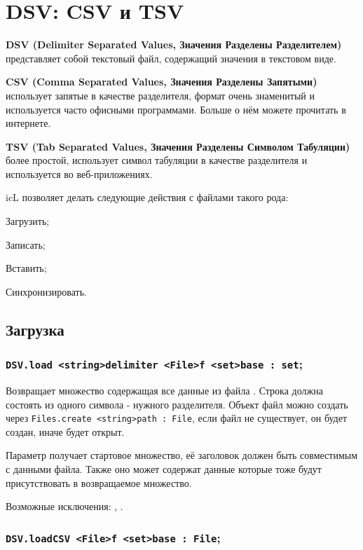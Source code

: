 \section{DSV: CSV и TSV}

{\bf DSV (Delimiter Separated Values, Значения Разделены Разделителем)} представляет собой текстовый файл, содержащий значения в текстовом виде.

{\bf CSV (Comma Separated Values, Значения Разделены Запятыми)} использует запятые в качестве разделителя, формат очень знаменитый и используется часто офисными программами. Больше о нём можете прочитать в интернете.

{\bf TSV (Tab Separated Values, Значения Разделены Символом Табуляции)} более простой, использует символ табуляции в качестве разделителя и используется во веб-приложениях.

icL позволяет делать следующие действия с файлами такого рода:
\begin{icItems}
	\item Загрузить;
	\item Записать;
	\item Вставить;
	\item Синхронизировать.
\end{icItems}

\subsection{Загрузка}

\subsubsection{\lstinline|DSV.load <string>delimiter <File>f <set>base : set|;}

Возвращает множество содержащая все данные из файла . Строка  должна состоять из одного символа - нужного разделителя. Объект файл можно создать через \lstinline|Files.create <string>path : File|, если файл не существует, он будет создан, иначе будет открыт.

Параметр  получает стартовое множество, её заголовок должен быть совместимым с данными файла. Также оно может содержат данные которые тоже будут присутствовать в возвращаемое множество. 

Возможные исключения: , .

\subsubsection{\lstinline|DSV.loadCSV <File>f <set>base : File|;}

